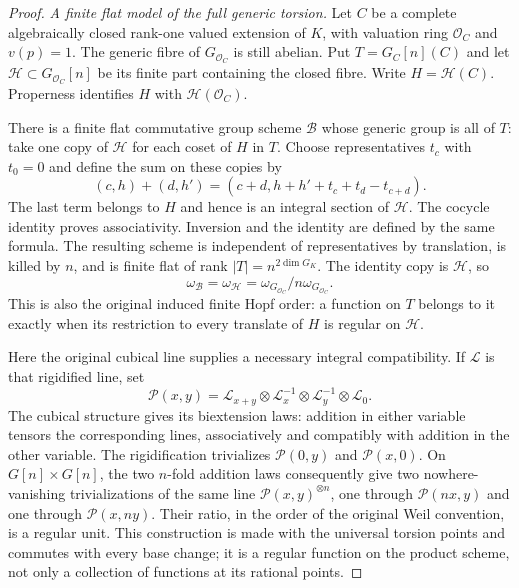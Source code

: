 \begin{proof}
\emph{A finite flat model of the full generic torsion.}
Let $C$ be a complete algebraically closed rank-one valued extension
of $K$, with valuation ring $\mathcal O_C$ and $v(p)=1$. The
generic fibre of $G_{\mathcal O_C}$ is still abelian. Put
$T=G_C[n](C)$ and let $\mathcal H\subset G_{\mathcal O_C}[n]$ be
its finite part containing the closed fibre. Write $H=\mathcal H(C)$.
Properness identifies $H$ with $\mathcal H(\mathcal O_C)$.

There is a finite flat commutative group scheme $\mathcal B$ whose
generic group is all of $T$: take one copy of $\mathcal H$ for each
coset of $H$ in $T$. Choose representatives $t_c$ with $t_0=0$ and define the sum
on these copies by
\[
 (c,h)+(d,h')=(c+d,h+h'+t_c+t_d-t_{c+d}).
 \tag{HS4}
\]
The last term belongs to $H$ and hence is an integral section of
$\mathcal H$. The cocycle identity proves associativity. Inversion
and the identity are defined by the same formula. The resulting
scheme is independent of representatives by translation, is killed
by $n$, and is finite flat of rank $|T|=n^{2\dim G_K}$.
The identity copy is $\mathcal H$, so
\[
 \omega_{\mathcal B}=\omega_{\mathcal H}
                      =\omega_{G_{\mathcal O_C}}/n\omega_{G_{\mathcal O_C}}.
 \tag{HS5}
\]
This is also the original induced finite Hopf order: a function on
$T$ belongs to it exactly when its restriction to every translate
of $H$ is regular on $\mathcal H$.

Here the original cubical line supplies a necessary integral
compatibility. If $\mathcal L$ is that rigidified line, set
\[
 \mathcal P(x,y)=\mathcal L_{x+y}\otimes\mathcal L_x^{-1}
                     \otimes\mathcal L_y^{-1}\otimes\mathcal L_0.
\]
The cubical structure gives its biextension laws: addition in
either variable tensors the corresponding lines, associatively
and compatibly with addition in the other variable. The
rigidification trivializes $\mathcal P(0,y)$ and
$\mathcal P(x,0)$. On $G[n]\times G[n]$, the two $n$-fold
addition laws consequently give two nowhere-vanishing
trivializations of the same line $\mathcal P(x,y)^{\otimes n}$,
one through $\mathcal P(nx,y)$ and one through
$\mathcal P(x,ny)$. Their ratio, in the order of the original
Weil convention, is a regular unit. This construction is made
with the universal torsion points and commutes with every base
change; it is a regular function on the product scheme, not only
a collection of functions at its rational points.


\end{proof}
